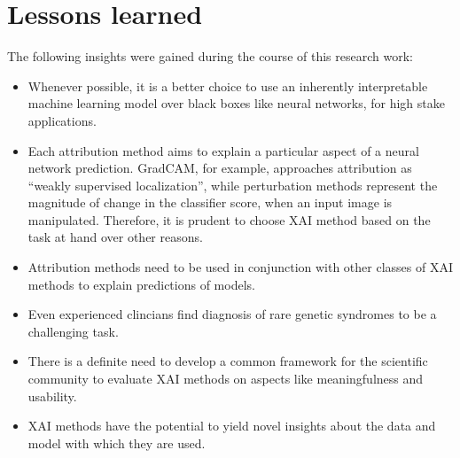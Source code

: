 \documentclass[../report.tex]{subfiles}
\begin{document}
	\section{Lessons learned}
	The following insights were gained during the course of this research work:
	\begin{itemize}
	\item Whenever possible, it is a better choice to use an inherently interpretable machine learning model over black boxes like neural networks, for high stake applications.
	\item Each attribution method aims to explain a particular aspect of a neural network prediction. GradCAM, for example, approaches attribution as \enquote{weakly supervised localization}, while perturbation methods represent the magnitude of change in the classifier score, when an input image is manipulated. Therefore, it is prudent to choose XAI method based on the task at hand over other reasons.
	\item Attribution methods need to be used in conjunction with other classes of XAI methods to explain predictions of models. 
	\item Even experienced clincians find diagnosis of rare genetic syndromes to be a challenging task.
	
	\item There is a definite need to develop a common framework for the scientific community to evaluate XAI methods on aspects like meaningfulness and usability.
	
	\item XAI methods have the potential to yield novel insights about the data and model with which they are used.
	\end{itemize}
\end{document}
